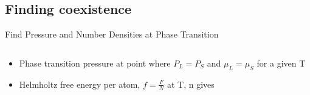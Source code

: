 \documentclass{beamer}
\begin{document}
\subsection*{Finding coexistence}
\begin{frame}{Find Pressure and Number Densities at  Phase Transition}
	\begin{columns}[t]
		\vspace{-2em}
		\begin{block}{}
			\begin{itemize} 
                 \item Phase transition pressure at point where $P_L=P_S$ and $\mu_L=\mu_S$ for a given T							
			     \vspace{+1em}
			     \item Helmholtz free energy per atom, $f=\frac{F}{N}$ at T, n gives


\end{itemize}
\end{block}
\end{columns}
\end{frame}
\end{document}
